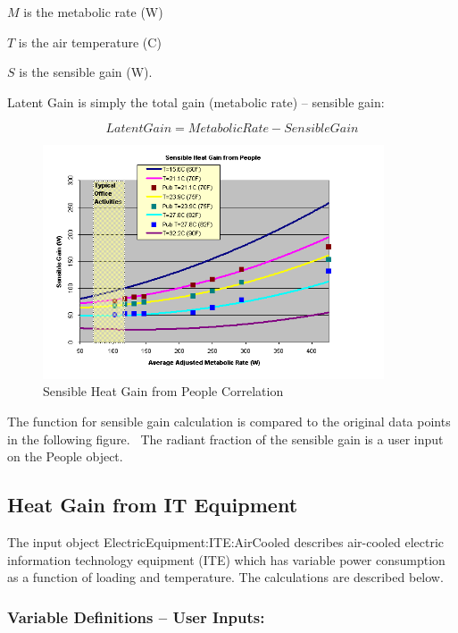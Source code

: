 \(M\) is the metabolic rate (W)

\(T\) is the air temperature (C)

\(S\) is the sensible gain (W).

Latent Gain is simply the total gain (metabolic rate) -- sensible gain:

\begin{equation}
LatentGain = MetabolicRate - SensibleGain
\end{equation}

\begin{figure}[hbtp] %
\centering
\includegraphics[width=0.9\textwidth, height=0.9\textheight, keepaspectratio=true]{media/image5820.png}
\caption{Sensible Heat Gain from People Correlation \protect \label{fig:sensible-heat-gain-from-people-correlation}}
\end{figure}

The function for sensible gain calculation is compared to the original data points in the following figure.~ The radiant fraction of the sensible gain is a user input on the People object.

\subsection{Heat Gain from IT Equipment}\label{heat-gain-from-it-equipment}

The input object ElectricEquipment:ITE:AirCooled describes air-cooled electric information technology equipment (ITE) which has variable power consumption as a function of loading and temperature. The calculations are described below.

\subsubsection{Variable Definitions -- User Inputs:}\label{variable-definitions-user-inputs}

